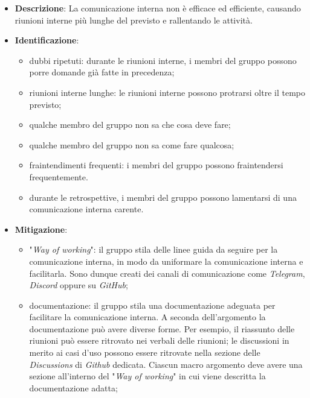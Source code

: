 \label{risk:comunicazione interna carente}
\begin{itemize}
	\item \textbf{Descrizione}:
	      La comunicazione interna non è efficace ed efficiente, causando riunioni
	      interne più lunghe del previsto e rallentando le attività.
	\item \textbf{Identificazione}:
	      \begin{itemize}
		      \item dubbi ripetuti: durante le riunioni interne, i membri del
		            gruppo possono porre domande già fatte in precedenza;

		      \item riunioni interne lunghe: le riunioni interne possono
		            protrarsi oltre il tempo previsto;

		      \item qualche membro del gruppo non sa che cosa deve fare;

		      \item qualche membro del gruppo non sa come fare qualcosa;

		      \item fraintendimenti frequenti: i membri del gruppo possono
		            fraintendersi frequentemente.

		      \item durante le retrospettive, i membri del gruppo possono
		            lamentarsi di una comunicazione interna carente.
	      \end{itemize}
	\item \textbf{Mitigazione}:
	      \begin{itemize}
		      \item "\textit{Way of working}": il gruppo stila delle linee guida
		            da seguire per la comunicazione interna, in modo da
		            uniformare la comunicazione interna e facilitarla. Sono
		            dunque creati dei canali di comunicazione come
		            \textit{Telegram}, \textit{Discord} oppure su
		            \textit{GitHub};

		      \item documentazione: il gruppo stila una documentazione
		            adeguata per facilitare la comunicazione interna. A seconda
		            dell'argomento la documentazione può avere diverse forme.
		            Per esempio, il riassunto delle riunioni può essere
		            ritrovato nei verbali delle riunioni; le discussioni in
		            merito ai casi d'uso possono essere ritrovate nella sezione
		            delle \textit{Discussions} di \textit{Github} dedicata.
		            Ciascun macro argomento deve avere una sezione all'interno
		            del "\textit{Way of working}" in cui viene descritta la
		            documentazione adatta;


\end{itemize}
\end{itemize}
